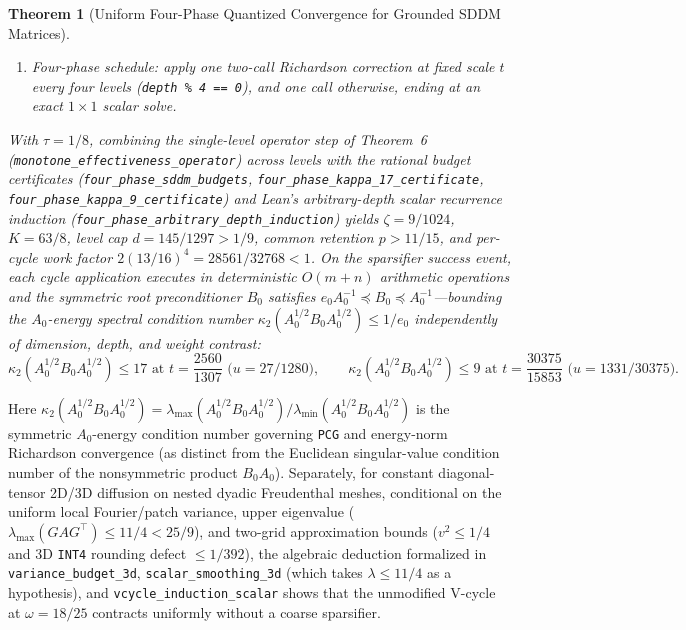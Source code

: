 \documentclass[10pt]{article}
\newtheorem{theorem}{Theorem}
\begin{document}
\begin{theorem}[Uniform Four-Phase Quantized Convergence for Grounded SDDM Matrices]
\begin{enumerate}
  \item \emph{Four-phase schedule:} apply one two-call Richardson correction at fixed scale $t$ every four levels (\texttt{depth \% 4 == 0}), and one call otherwise, ending at an exact $1\times 1$ scalar solve.
\end{enumerate}
With $\tau = 1/8$, combining the single-level operator step of Theorem~6 (\texttt{monotone\_effectiveness\_operator}) across levels with the rational budget certificates (\texttt{four\_phase\_sddm\_budgets}, \texttt{four\_phase\_kappa\_17\_certificate}, \texttt{four\_phase\_kappa\_9\_certificate}) and Lean's arbitrary-depth scalar recurrence induction (\texttt{four\_phase\_arbitrary\_depth\_induction}) yields $\zeta = 9/1024$, $K = 63/8$, level cap $d = 145/1297 > 1/9$, common retention $p > 11/15$, and per-cycle work factor $2(13/16)^4 = 28561/32768 < 1$. On the sparsifier success event, each cycle application executes in deterministic $O(m+n)$ arithmetic operations and the symmetric root preconditioner $B_0$ satisfies $e_0 A_0^{-1} \preceq B_0 \preceq A_0^{-1}$---bounding the $A_0$-energy spectral condition number $\kappa_2(A_0^{1/2} B_0 A_0^{1/2}) \le 1/e_0$ independently of dimension, depth, and weight contrast:
\[
  \kappa_2(A_0^{1/2} B_0 A_0^{1/2}) \le 17 \text{ at } t = \frac{2560}{1307} \text{ ($u = 27/1280$)}, \qquad
  \kappa_2(A_0^{1/2} B_0 A_0^{1/2}) \le 9 \text{ at } t = \frac{30375}{15853} \text{ ($u = 1331/30375$)}.
\]
\end{theorem}

Here $\kappa_2(A_0^{1/2} B_0 A_0^{1/2}) = \lambda_{\max}(A_0^{1/2} B_0 A_0^{1/2}) / \lambda_{\min}(A_0^{1/2} B_0 A_0^{1/2})$ is the symmetric $A_0$-energy condition number governing \texttt{PCG} and energy-norm Richardson convergence (as distinct from the Euclidean singular-value condition number of the nonsymmetric product $B_0 A_0$). Separately, for constant diagonal-tensor 2D/3D diffusion on nested dyadic Freudenthal meshes, conditional on the uniform local Fourier/patch variance, upper eigenvalue ($\lambda_{\max}(G A G^\top) \le 11/4 < 25/9$), and two-grid approximation bounds ($v^2 \le 1/4$ and 3D \texttt{INT4} rounding defect $\le 1/392$), the algebraic deduction formalized in \texttt{variance\_budget\_3d}, \texttt{scalar\_smoothing\_3d} (which takes $\lambda \le 11/4$ as a hypothesis), and \texttt{vcycle\_induction\_scalar} shows that the unmodified V-cycle at $\omega = 18/25$ contracts uniformly without a coarse sparsifier.
\end{document}
